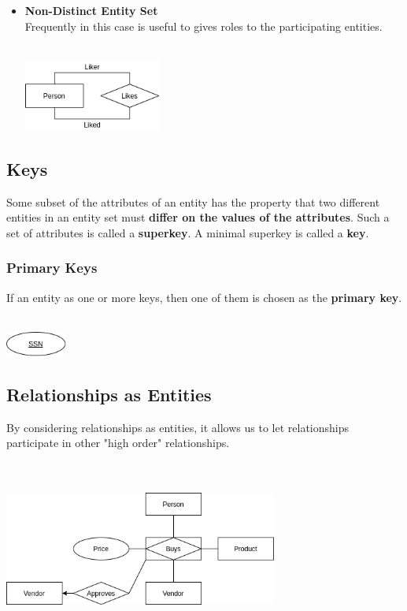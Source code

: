 \documentclass{article}
\begin{document}
\begin{itemize}
	\item \textbf{Non-Distinct Entity Set}
	\vspace{.2cm} \\
	Frequently in this case is useful to gives roles to the participating entities. \\ \\
	
	\centerline{\includegraphics[width=4.5cm]{./assets/nondistinct.png}}
	\vspace{.6cm}
\end{itemize}

\subsection{Keys}
Some subset of the attributes of an entity has the property that two different entities in an entity set must \textbf{differ on the values of the attributes}. Such a set of attributes is called a \textbf{superkey}. A minimal superkey is called a \textbf{key}.

\subsubsection{Primary Keys}
If an entity as one or more keys, then one of them is chosen as the \textbf{primary key}. \\ \\

\centerline{\includegraphics[width=2cm]{./assets/key.png}}

\subsection{Relationships as Entities}
By considering relationships as entities, it allows us to let relationships participate in other "high order" relationships. \\ \\ \\

\centerline{\includegraphics[width=9cm]{./assets/rel-ent.png}}
\vspace{.6cm}
\end{document}
